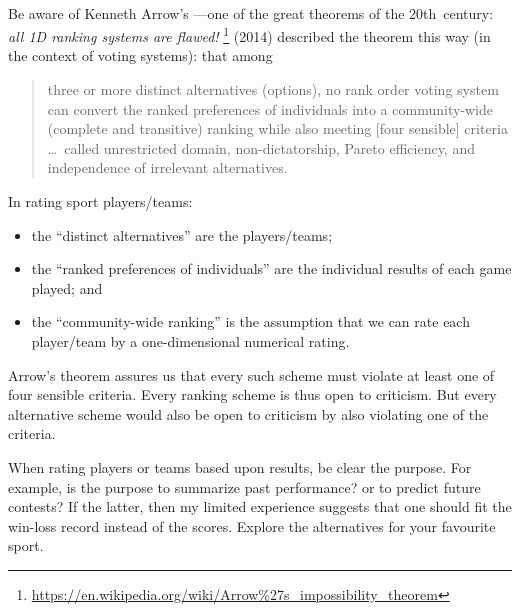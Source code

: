 \begin{table}
\begin{minipage}{\linewidth}
\hrulefill\\
Be aware of Kenneth Arrow's  \cite[]{Arrow50}---one of the great theorems of the 20th~century: \emph{all 1D ranking systems are flawed!}  
\footnote{\protect\url{https://en.wikipedia.org/wiki/Arrow\%27s\_impossibility\_theorem}}
 (2014) described the theorem this way (in the context of voting systems): that among 
\begin{quote}
three or more distinct alternatives (options), no rank order voting system can convert the ranked preferences of individuals into a community-wide (complete and transitive) ranking while also meeting [four sensible] criteria \ldots\ called unrestricted domain, non-dictatorship, Pareto efficiency, and independence of irrelevant alternatives.
\end{quote}
In rating sport players\slash teams:
\begin{itemize}
\item the ``distinct alternatives'' are the players\slash teams;
\item  the ``ranked preferences of individuals'' are the individual results of each game played; and 
\item the ``community-wide ranking'' is the assumption that we can rate each player\slash team by a one-dimensional numerical rating.
\end{itemize}
Arrow's theorem assures us that every such scheme must violate at least one of four sensible criteria.
Every ranking scheme is thus open to criticism. 
But every alternative scheme would also be open to criticism by also violating one of the criteria.
\end{minipage}
\end{table}


When rating players or teams based upon results, be clear the purpose.  
For example, is the purpose to summarize past performance? or to predict future contests?  
If the latter, then my limited experience suggests that one should fit the win-loss record instead of the scores.
Explore the alternatives for your favourite sport.




\begin{comment}
Further applications include least square regression  \larsvii{p.92--4*} \holti{p.399--401}, least square approximations, and Fourier series \larsvii{p.275--281}.
\end{comment}



